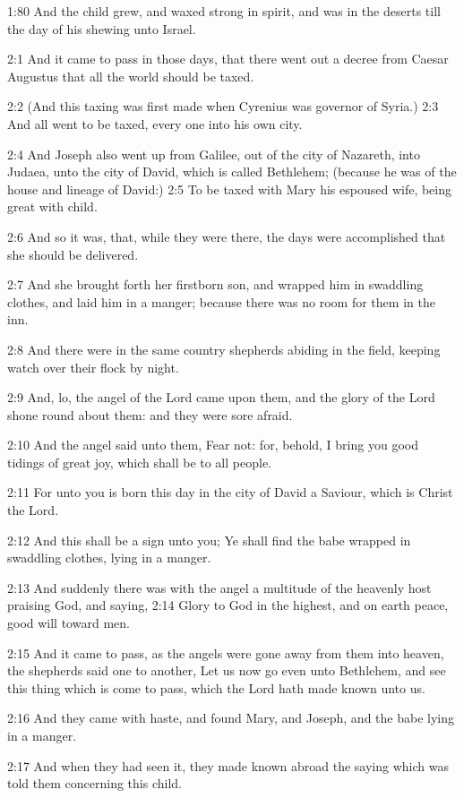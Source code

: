 1:80 And the child grew, and waxed strong in spirit, and was in the deserts till the day of his shewing unto Israel.

2:1 And it came to pass in those days, that there went out a decree from Caesar Augustus that all the world should be taxed.

2:2 (And this taxing was first made when Cyrenius was governor of Syria.)  2:3 And all went to be taxed, every one into his own city.

2:4 And Joseph also went up from Galilee, out of the city of Nazareth, into Judaea, unto the city of David, which is called Bethlehem; (because he was of the house and lineage of David:) 2:5 To be taxed with Mary his espoused wife, being great with child.

2:6 And so it was, that, while they were there, the days were accomplished that she should be delivered.

2:7 And she brought forth her firstborn son, and wrapped him in swaddling clothes, and laid him in a manger; because there was no room for them in the inn.

2:8 And there were in the same country shepherds abiding in the field, keeping watch over their flock by night.

2:9 And, lo, the angel of the Lord came upon them, and the glory of the Lord shone round about them: and they were sore afraid.

2:10 And the angel said unto them, Fear not: for, behold, I bring you good tidings of great joy, which shall be to all people.

2:11 For unto you is born this day in the city of David a Saviour, which is Christ the Lord.

2:12 And this shall be a sign unto you; Ye shall find the babe wrapped in swaddling clothes, lying in a manger.

2:13 And suddenly there was with the angel a multitude of the heavenly host praising God, and saying, 2:14 Glory to God in the highest, and on earth peace, good will toward men.

2:15 And it came to pass, as the angels were gone away from them into heaven, the shepherds said one to another, Let us now go even unto Bethlehem, and see this thing which is come to pass, which the Lord hath made known unto us.

2:16 And they came with haste, and found Mary, and Joseph, and the babe lying in a manger.

2:17 And when they had seen it, they made known abroad the saying which was told them concerning this child.

